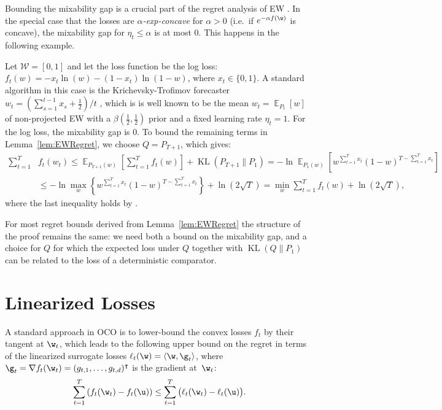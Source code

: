 \documentclass{colt2018} %
\DeclareMathOperator*{\E}{\mathbb{E}}
\DeclareMathOperator{\kl}{KL}
\renewcommand{\top}{\intercal}
\newcommand{\half}{\frac{1}{2}}
\newcommand{\domainw}{\mathcal{W}}
\newcommand{\inner}[2]{\langle #1, #2 \rangle}  %
\newcommand{\sloss}{\ell}                       %
\begin{document}
Bounding the mixability gap is a crucial part of the regret analysis of
EW \citep{Vovk2001,DeRooijVanErvenGrunwaldKoolen2014}. In the special
case that the losses are \emph{$\alpha$-exp-concave} for $\alpha > 0$
(i.e.\ if $e^{-\alpha f(\w)}$ is concave), the mixability gap for
$\eta_t \leq \alpha$ is at most $0$. This happens in the following
example.

\begin{example}\label{ex:KT}
  Let $\domainw = [0,1]$ and let the loss function be the log loss: $f_t(w) = 
  -x_t\ln(w) - (1-x_t)\ln(1-w)$, where $x_t \in \{0, 1\}$. A standard
  algorithm in this case is the 
  Krichevsky-Trofimov forecaster $w_t = (\sum_{s=1}^{t-1}x_s +
  \half)/t$
  \citep[Chapter~9]{CesaBianchiLugosi2006}, which is 
  is well known to be the mean $w_t = \E_{P_t}[w]$ of
  non-projected EW with a $\beta(\frac{1}{2}, \frac{1}{2})$ prior 
  and a fixed learning rate $\eta_t = 1$. 
  For the log loss, the mixability gap is $0$. 
To bound the remaining terms in Lemma~\ref{lem:EWRegret}, we choose $Q =
P_{T+1}$, which gives:
\begin{align*}
\sum_{t=1}^T &f_t(w_t)
\leq \E_{P_{T+1}(w)}\left[\sum_{t=1}^T f_t(w)\right] + \kl(P_{T+1}\|P_1) 
= -\ln \E_{P_1(w)}[w^{\sum_{t=1}^T x_t}(1-w)^{T - \sum_{t=1}^T x_t}]\\
&\leq -\ln \max_w \left\{w^{\sum_{t=1}^T x_t}(1-w)^{T - \sum_{t=1}^T
x_t}\right\}
+ \ln(2\sqrt{T})
= \min_w \sum_{t=1}^T f_t(w) + \ln(2\sqrt{T}),
\end{align*}
% 
where the last inequality holds by
\citep[Lemma~9.3]{CesaBianchiLugosi2006}.
\end{example}
% 
For most regret bounds derived from Lemma~\ref{lem:EWRegret} the
structure of the proof remains the same: we need both a bound on the
mixability gap, and a choice for $Q$ for which the expected loss under
$Q$ together with $\kl(Q\|P_1)$ can be related to the loss of a
deterministic comparator.
% 
% 

\section{Linearized Losses}
\label{sec:linearloss}

A standard approach in OCO is to lower-bound the convex losses $f_t$ by
their tangent at $\w_t$, which leads to the following upper bound on the
regret in terms of the linearized surrogate losses $\sloss_t(\w) =
\inner{\w}{\g_t}$, where $\g_t = \nabla f_t(\w_t) =
(g_{t,1},\ldots,g_{t,d})^\top$ is the gradient at~$\w_t$:
% 
\begin{equation}\label{eqn:linearizedloss}
  \sum_{t=1}^T \left(f_t(\w_t) - f_t(\u)\right) \leq \sum_{t=1}^T
  \big(\sloss_t(\w_t) - \sloss_t(\u)\big).
\end{equation}
\end{document}
